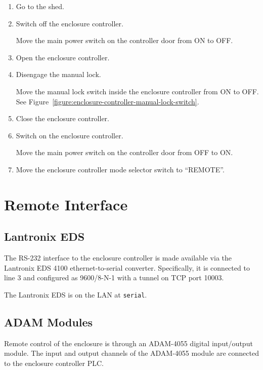 \begin{enumerate}
\item
Go to the shed.

\item Switch off the enclosure controller.

Move the main power switch on the controller door from ON to OFF.

\item Open the enclosure controller.

\item
Disengage the manual lock.

Move the manual lock switch inside the enclosure controller from ON to OFF. See Figure~\ref{figure:enclosure-controller-manual-lock-switch}.

\item
Close the enclosure controller.

\item Switch on the enclosure controller.

Move the main power switch on the controller door from OFF to ON.

\item Move the enclosure controller mode selector switch to “REMOTE”.

\end{enumerate}

\section{Remote Interface}

\subsection{Lantronix EDS}
\label{section:enclosure-lantronix-eds}

The RS-232 interface to the enclosure controller is made available via the Lantronix EDS 4100 ethernet-to-serial converter. Specifically, it is connected to line 3 and configured as 9600/8-N-1 with a tunnel on TCP port 10003.

The Lantronix EDS is on the LAN at \verb|serial|.

\subsection{ADAM Modules}
\label{section:enclosure-adam-modules}

Remote control of the enclosure is through an ADAM-4055 digital input/output module. The input and output channels of the ADAM-4055 module are connected to the enclosure controller PLC.

